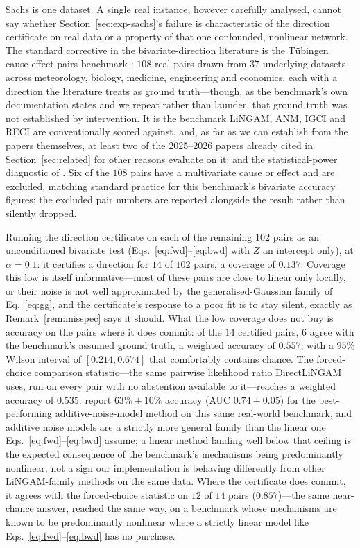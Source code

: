 Sachs is one dataset. A single real instance, however carefully analysed,
cannot say whether Section~\ref{sec:exp-sachs}'s failure is characteristic of
the direction certificate on real data or a property of that one confounded,
nonlinear network. The standard corrective in the bivariate-direction
literature is the Tübingen cause-effect pairs benchmark
\citep{mooij2016distinguishing}: $108$ real pairs drawn from $37$ underlying
datasets across meteorology, biology, medicine, engineering and economics,
each with a direction the literature treats as ground truth---though, as the
benchmark's own documentation states and we repeat rather than launder, that
ground truth was not established by intervention. It is the benchmark
LiNGAM, ANM, IGCI and RECI are conventionally scored against, and, as far as
we can establish from the papers themselves, at least two of the 2025--2026
papers already cited in Section~\ref{sec:related} for other reasons evaluate
on it: \citet{ding2025gaussdetect} and the statistical-power diagnostic of
\citet{prakash2026power}. Six of the $108$ pairs have a multivariate cause or
effect and are excluded, matching standard practice for this benchmark's
bivariate accuracy figures; the excluded pair numbers are reported alongside
the result rather than silently dropped.

Running the direction certificate on each of the remaining $102$ pairs as an
unconditioned bivariate test (Eqs.~\eqref{eq:fwd}--\eqref{eq:bwd} with $Z$ an
intercept only), at $\alpha=0.1$: it certifies a direction for $14$ of $102$
pairs, a coverage of $0.137$. Coverage this low is itself informative---most
of these pairs are close to linear only locally, or their noise is not well
approximated by the generalised-Gaussian family of Eq.~\eqref{eq:gg}, and the
certificate's response to a poor fit is to stay silent, exactly as
Remark~\ref{rem:misspec} says it should. What the low coverage does not buy is
accuracy on the pairs where it does commit: of the $14$ certified pairs, $6$
agree with the benchmark's assumed ground truth, a weighted accuracy of
$0.557$, with a $95\%$ Wilson interval of $[0.214, 0.674]$ that comfortably
contains chance. The forced-choice comparison statistic---the same pairwise
likelihood ratio DirectLiNGAM uses, run on every pair with no abstention
available to it---reaches a weighted accuracy of $0.535$. \citet{mooij2016distinguishing}
report $63\% \pm 10\%$ accuracy (AUC $0.74 \pm 0.05$) for the best-performing
additive-noise-model method on this same real-world benchmark, and additive
noise models are a strictly more general family than the linear one
Eqs.~\eqref{eq:fwd}--\eqref{eq:bwd} assume; a linear method landing well below
that ceiling is the expected consequence of the benchmark's mechanisms being
predominantly nonlinear, not a sign our implementation is behaving
differently from other LiNGAM-family methods on the same data. Where
the certificate does commit, it agrees with the forced-choice statistic on
$12$ of $14$ pairs ($0.857$)---the same near-chance answer, reached the same
way, on a benchmark whose mechanisms are known to be predominantly nonlinear
where a strictly linear model like Eqs.~\eqref{eq:fwd}--\eqref{eq:bwd} has no
purchase.

